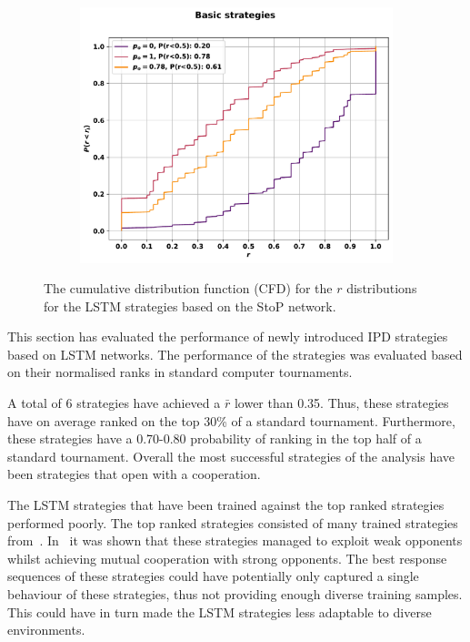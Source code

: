 \begin{figure}[!htbp]
\begin{subfigure}{.5\textwidth}
    \end{subfigure}\hfill
    \begin{subfigure}{.5\textwidth}
    \centering
    \includegraphics[width=.75\textwidth]{src/chapters/07/img/cfd_to_probability_basic_strategies.pdf}
    \end{subfigure}
    \caption{The cumulative distribution function (CFD)
    for the \(r\) distributions for the LSTM strategies based on the StoP
    network.}\label{fig:cfd_s_to_p}
\end{figure}

This section has evaluated the performance of \lstmstrategies newly introduced
IPD strategies based on LSTM networks. The performance of the strategies was
evaluated based on their normalised ranks in \metatournamentslstm standard
computer tournaments.

A total of 6 strategies have achieved a \(\bar{r}\) lower than 0.35. Thus, these
strategies have on average ranked on the top 30\% of a standard tournament.
Furthermore, these strategies have a 0.70-0.80 probability of ranking in the top half of a
standard tournament. Overall the most successful strategies of the analysis have
been strategies that open with a cooperation.

The LSTM strategies that have been trained against the top ranked
strategies performed poorly. The top ranked strategies consisted of many trained
strategies from~\cite{Harper2017}. In~\cite{Harper2017} it was shown that these
strategies managed to exploit weak opponents whilst achieving mutual cooperation
with strong opponents. The best response sequences of these strategies could
have potentially only captured a single behaviour of these strategies, thus not
providing enough diverse training samples. This could have in turn made the LSTM
strategies less adaptable to diverse environments.

